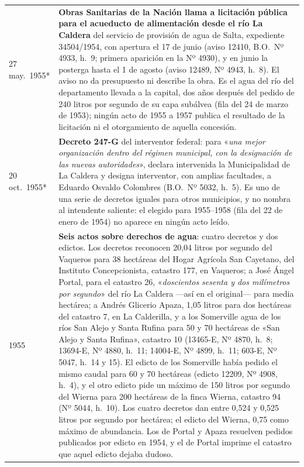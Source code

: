 \begin{longtable}{@{}p{2.7cm}p{10.3cm}@{}}
27 may.\ 1955* & \textbf{Obras Sanitarias de la Nación llama a licitación pública para el acueducto de alimentación desde el río La Caldera} del servicio de provisión de agua de Salta, expediente 34504/1954, con apertura el 17 de junio (aviso 12410, B.O.\ Nº 4933, h.\ 9; primera aparición en la Nº 4930), y en junio la posterga hasta el 1 de agosto (aviso 12489, Nº 4943, h.\ 8). El aviso no da presupuesto ni describe la obra. Es el agua del río del departamento llevada a la capital, dos años después del pedido de 240 litros por segundo de su capa subálvea (fila del 24 de marzo de 1953); ningún acto de 1955 a 1957 publica el resultado de la licitación ni el otorgamiento de aquella concesión. \\
20 oct.\ 1955* & \textbf{Decreto 247-G} del interventor federal: para «\textit{una mejor organización dentro del régimen municipal, con la designación de las nuevas autoridades}», declara intervenida la Municipalidad de La Caldera y designa interventor, con amplias facultades, a Eduardo Osvaldo Colombres (B.O.\ Nº 5032, h.\ 5). Es uno de una serie de decretos iguales para otros municipios, y no nombra al intendente saliente: el elegido para 1955--1958 (fila del 22 de enero de 1954) no aparece en ningún acto leído. \\
1955 & \textbf{Seis actos sobre derechos de agua}: cuatro decretos y dos edictos. Los decretos reconocen 20,04 litros por segundo del Vaqueros para 38 hectáreas del Hogar Agrícola San Cayetano, del Instituto Concepcionista, catastro 177, en Vaqueros; a José Ángel Portal, para el catastro 26, «\textit{doscientos sesenta y dos milímetros por segundo}» del río La Caldera ---así en el original--- para media hectárea; a Andrés Glicerio Apaza, 1,05 litros para dos hectáreas del catastro 7, en La Calderilla, y a los Somerville agua de los ríos San Alejo y Santa Rufina para 50 y 70 hectáreas de «San Alejo y Santa Rufina», catastro 10 (13465-E, Nº 4870, h.\ 8; 13694-E, Nº 4880, h.\ 11; 14004-E, Nº 4899, h.\ 11; 603-E, Nº 5047, h.\ 14 y 15). El edicto de los Somerville había pedido el mismo caudal para 60 y 70 hectáreas (edicto 12209, Nº 4908, h.\ 4), y el otro edicto pide un máximo de 150 litros por segundo del Wierna para 200 hectáreas de la finca Wierna, catastro 94 (Nº 5044, h.\ 10). Los cuatro decretos dan entre 0,524 y 0,525 litros por segundo por hectárea; el edicto del Wierna, 0,75 como máximo de abundancia. Los de Portal y Apaza resuelven pedidos publicados por edicto en 1954, y el de Portal imprime el catastro que aquel edicto dejaba dudoso. \\

\end{longtable}
